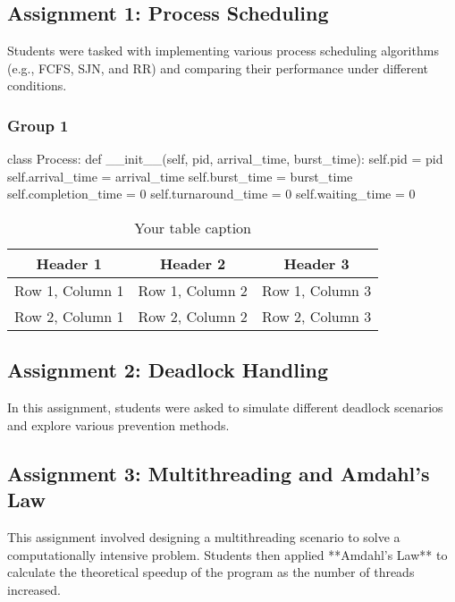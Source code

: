 \documentclass[12pt]{article}
\begin{document}
\subsection{Assignment 1: Process Scheduling}
Students were tasked with implementing various process scheduling algorithms (e.g., FCFS, SJN, and RR) and comparing their performance under different conditions.
\subsubsection{Group 1}
\begin{python}
    class Process:
    def __init__(self, pid, arrival_time, burst_time):
        self.pid = pid
        self.arrival_time = arrival_time
        self.burst_time = burst_time
        self.completion_time = 0
        self.turnaround_time = 0
        self.waiting_time = 0
\end{python}

\begin{table}[htbp] %
    \centering
    \begin{tabular}{|c|c|c|} %
    \hline
    Header 1 & Header 2 & Header 3 \\ %
    \hline
    Row 1, Column 1 & Row 1, Column 2 & Row 1, Column 3 \\ %
    \hline
    Row 2, Column 1 & Row 2, Column 2 & Row 2, Column 3 \\ %
    \hline
    \end{tabular}
    \caption{Your table caption} %
    \label{tab:your_label} %
\end{table}
\subsection{Assignment 2: Deadlock Handling}
In this assignment, students were asked to simulate different deadlock scenarios and explore various prevention methods.

\subsection{Assignment 3: Multithreading and Amdahl's Law}
This assignment involved designing a multithreading scenario to solve a computationally intensive problem. Students then applied **Amdahl's Law** to calculate the theoretical speedup of the program as the number of threads increased.
\end{document}
